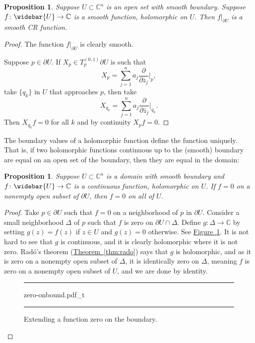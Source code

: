 \documentclass[12pt,openany]{book}
\newcommand{\C}{{\mathbb{C}}}
\theoremstyle{plain}
\newtheorem{prop}[thm]{Proposition}
\theoremstyle{remark}
\theoremstyle{definition}
\newenvironment{myfig}{%
\begin{figure}[h!t]
\noindent\rule{\textwidth}{0.5pt}\vspace{12pt}\par\centering}%
{\par\noindent\rule{\textwidth}{0.5pt}
\end{figure}}
\theoremstyle{exercise}
\theoremstyle{example}
\newcommand{\figureref}[1]{\hyperref[#1]{Figure~\ref*{#1}}}
\newcommand{\thmref}[1]{\hyperref[#1]{Theorem~\ref*{#1}}}
\begin{document}
\begin{prop} \label{prop:boundaryvaluesCR}
Suppose $U \subset \C^n$ is an open set with smooth boundary.  Suppose
$f \colon \widebar{U} \to \C$ is a smooth function, holomorphic on $U$.
Then $f|_{\partial U}$ is a smooth CR function.
\end{prop}

\begin{proof}
The function $f|_{\partial U}$ is clearly smooth.

Suppose $p \in \partial U$.
If $X_p \in T_p^{(0,1)} \partial U$ is such that
\begin{equation*}
X_p = \sum_{j=1}^n a_j \frac{\partial}{\partial \bar{z}_j} \Big|_p ,
\end{equation*}
take $\{ q_k \}$ in $U$ that approaches $p$, then take
\begin{equation*}
X_{q_k} = \sum_{j=1}^n a_j \frac{\partial}{\partial \bar{z}_j} \Big|_{q_k} .
\end{equation*}
Then $X_{q_k} f = 0$ for all $k$ and by continuity $X_p f = 0$.
\end{proof}

\pagebreak[2]
The boundary values of a holomorphic function define the function uniquely.
That is, if two holomorphic functions continuous up to the (smooth) boundary
are equal on an open set of the boundary, then they are equal in the domain:

\begin{prop} \label{prop:boundaryvaluesdeterminef}
Suppose $U \subset \C^n$ is a domain with smooth boundary and $f \colon
\widebar{U} \to \C$ is 
a continuous function, holomorphic on $U$.  If $f=0$ on a nonempty open subset of $\partial
U$, then $f=0$ on all of $U$.
\end{prop}

\begin{proof}
Take $p \in \partial U$ such that $f=0$ on a neighborhood of $p$ in
$\partial U$.  Consider a small neighborhood $\Delta$ of $p$ such
that $f$ is zero on $\partial U \cap \Delta$.  Define $g \colon \Delta \to
\C$ by setting $g(z) = f(z)$ if $z \in U$ and $g(z) = 0$ otherwise.
See \figureref{fig:zero-onbound}.
It is not hard to see that $g$ is continuous, and it is clearly holomorphic
where it is not zero.  Rad{\'o}'s theorem
(\thmref{thm:rado}) says that $g$ is holomorphic, and as it is zero on a
nonempty open subset of $\Delta$, it is identically zero on $\Delta$,
meaning $f$ is zero on a nonempty open subset of $U$, and we are done by
identity.

\begin{myfig}
{zero-onbound.pdf_t}
\caption{Extending a function zero on the boundary.\label{fig:zero-onbound}}
\end{myfig}
\end{proof}
\end{document}
